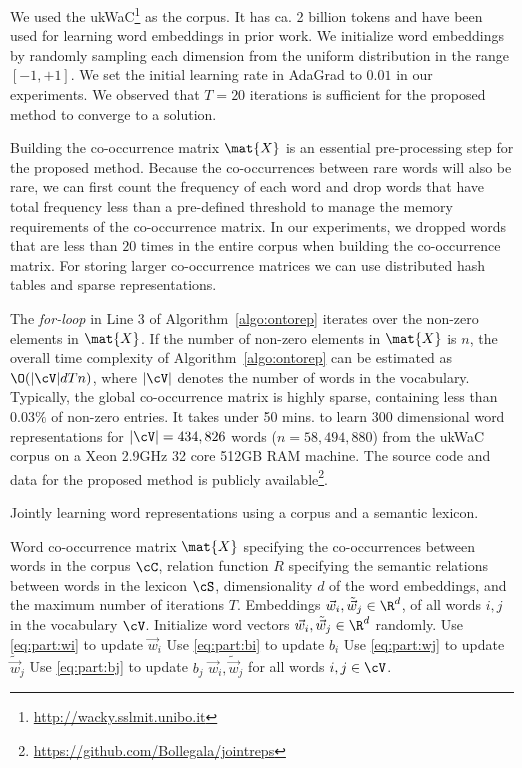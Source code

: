 \documentclass[letterpaper]{article}
\begin{document}
We used the ukWaC\footnote{\url{http://wacky.sslmit.unibo.it}} as the corpus.
It has ca. 2 billion tokens and have been used for learning word embeddings in prior work.
We initialize word embeddings by randomly sampling each dimension from the uniform distribution in the range $[-1,+1]$.
We set the initial learning rate in AdaGrad to $0.01$ in our experiments.
We observed that $T = 20$ iterations is sufficient for the proposed method to converge to a solution.

Building the co-occurrence matrix $\mat{X}$ is an essential pre-processing step for the proposed method.
Because the co-occurrences between rare words will also be rare, we can first count the frequency of each word and
drop words that have total frequency less than a pre-defined threshold to manage the memory requirements of the
co-occurrence matrix. In our experiments, we dropped words that are less than $20$ times in the entire corpus
when building the co-occurrence matrix.
For storing larger co-occurrence matrices we can use distributed hash tables and sparse representations.

The \emph{for-loop} in Line 3 of Algorithm~\ref{algo:ontorep} iterates over the non-zero
elements in $\mat{X}$. If the number of non-zero elements in $\mat{X}$ is $n$, the overall time complexity
of Algorithm~\ref{algo:ontorep} can be estimated as $\O(|\cV|dTn)$, where $|\cV|$ denotes the number of words
in the vocabulary.
Typically, the global co-occurrence matrix is highly sparse, containing less than $0.03\%$ of non-zero entries.
It takes under 50 mins. to learn $300$ dimensional word representations for $|\cV| = 434,826$ words
($n = 58,494,880$) from the ukWaC corpus
on a Xeon 2.9GHz 32 core 512GB RAM machine.
The source code and data for the proposed method is publicly available\footnote{\url{https://github.com/Bollegala/jointreps}}.

\begin{algorithm}[t]
\small
\caption{Jointly learning word representations using a corpus and a semantic lexicon.}
\label{algo:ontorep}
\begin{algorithmic}[1]
\REQUIRE Word co-occurrence matrix $\mat{X}$ specifying the co-occurrences between words in the corpus $\cC$,
relation function $R$ specifying the semantic relations between words in the lexicon $\cS$,
dimensionality $d$ of the word embeddings, and the maximum number of iterations $T$.
\ENSURE Embeddings $\vec{w}_i, \tilde{\vec{w}}_j \in \R^d$, of all words $i, j$ in the vocabulary $\cV$.
\medskip
\STATE Initialize word vectors $\vec{w}_i, \tilde{\vec{w}}_j \in \R^d$ randomly. \label{line:init}
\STATE Use \eqref{eq:part:wi} to update $\vec{w}_i$
\STATE Use \eqref{eq:part:bi} to update $b_i$
\STATE Use \eqref{eq:part:wj} to update $\tilde{\vec{w}}_j$
\STATE Use \eqref{eq:part:bj} to update $b_j$
\ENDFOR
\ENDFOR
\RETURN $\vec{w}_i, \tilde{\vec{w}}_j$ for all words $i,j \in \cV$.
\end{algorithmic}
\end{algorithm}
\end{document}
